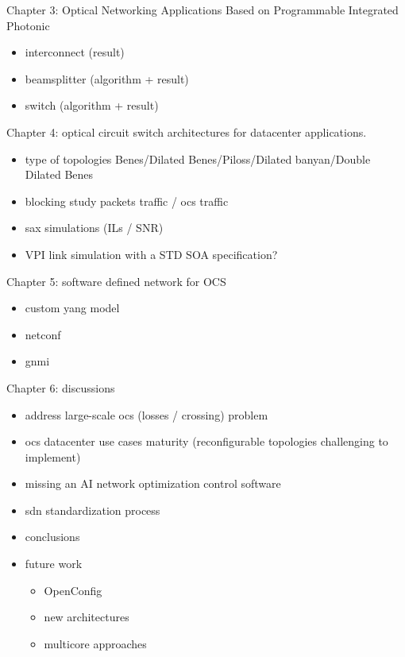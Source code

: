 \documentclass{article}
\begin{document}
Chapter 3: Optical Networking Applications Based on Programmable Integrated Photonic
\begin{itemize}
    \item interconnect (result)
    \item beamsplitter (algorithm + result)
    \item switch (algorithm + result)
\end{itemize}

Chapter 4: optical circuit switch architectures for datacenter applications.
\begin{itemize}
    \item type of topologies Benes/Dilated Benes/Piloss/Dilated banyan/Double Dilated Benes
    \item blocking study packets traffic / ocs traffic
    \item sax simulations (ILs / SNR)
    \item VPI link simulation with a STD SOA specification?
\end{itemize}

Chapter 5: software defined network for OCS
\begin{itemize}
    \item custom yang model
    \item netconf
    \item gnmi
\end{itemize}

Chapter 6: discussions
\begin{itemize}
    \item address large-scale ocs (losses / crossing) problem
    \item ocs datacenter use cases maturity (reconfigurable topologies challenging to implement)
    \item missing an AI network optimization control software
    \item sdn standardization process
    \item conclusions
    \item future work
          \begin{itemize}
              \item OpenConfig
              \item new architectures
              \item multicore approaches
          \end{itemize}
\end{itemize}
\end{document}

